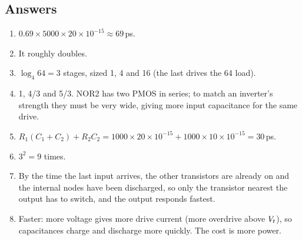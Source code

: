 \subsection*{Answers}
\begin{enumerate}
  \item $0.69 \times 5000 \times 20\times10^{-15} \approx 69$\,ps.
  \item It roughly doubles.
  \item $\log_4 64 = 3$ stages, sized 1, 4 and 16 (the last drives the 64 load).
  \item 1, 4/3 and 5/3. NOR2 has two PMOS in series; to match an inverter's strength they must be very wide, giving more input capacitance for the same drive.
  \item $R_1(C_1 + C_2) + R_2 C_2 = 1000 \times 20\times10^{-15} + 1000 \times 10\times10^{-15} = 30$\,ps.
  \item $3^2 = 9$ times.
  \item By the time the last input arrives, the other transistors are already on and the internal nodes have been discharged, so only the transistor nearest the output has to switch, and the output responds fastest.
  \item Faster: more voltage gives more drive current (more overdrive above $V_{t}$), so capacitances charge and discharge more quickly. The cost is more power.
\end{enumerate}
